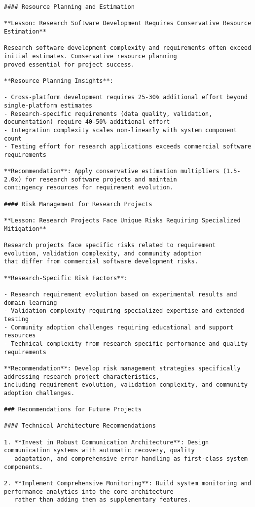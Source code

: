 \documentclass[11pt,a4paper]{report}
\begin{document}
\begin{verbatim}
#### Resource Planning and Estimation

**Lesson: Research Software Development Requires Conservative Resource Estimation**

Research software development complexity and requirements often exceed initial estimates. Conservative resource planning
proved essential for project success.

**Resource Planning Insights**:

- Cross-platform development requires 25-30% additional effort beyond single-platform estimates
- Research-specific requirements (data quality, validation, documentation) require 40-50% additional effort
- Integration complexity scales non-linearly with system component count
- Testing effort for research applications exceeds commercial software requirements

**Recommendation**: Apply conservative estimation multipliers (1.5-2.0x) for research software projects and maintain
contingency resources for requirement evolution.

#### Risk Management for Research Projects

**Lesson: Research Projects Face Unique Risks Requiring Specialized Mitigation**

Research projects face specific risks related to requirement evolution, validation complexity, and community adoption
that differ from commercial software development risks.

**Research-Specific Risk Factors**:

- Research requirement evolution based on experimental results and domain learning
- Validation complexity requiring specialized expertise and extended testing
- Community adoption challenges requiring educational and support resources
- Technical complexity from research-specific performance and quality requirements

**Recommendation**: Develop risk management strategies specifically addressing research project characteristics,
including requirement evolution, validation complexity, and community adoption challenges.

### Recommendations for Future Projects

#### Technical Architecture Recommendations

1. **Invest in Robust Communication Architecture**: Design communication systems with automatic recovery, quality
   adaptation, and comprehensive error handling as first-class system components.

2. **Implement Comprehensive Monitoring**: Build system monitoring and performance analytics into the core architecture
   rather than adding them as supplementary features.


\end{verbatim}
\end{document}
